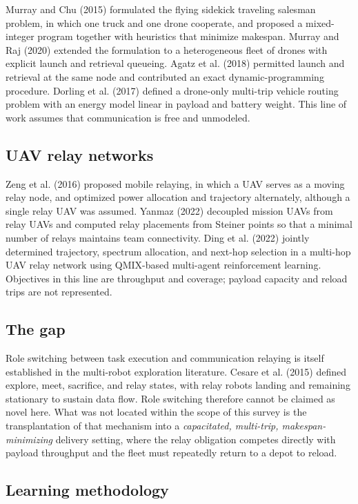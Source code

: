 \documentclass[12pt]{article}
\begin{document}
Murray and Chu (2015) formulated the flying sidekick traveling salesman problem, in which one truck
and one drone cooperate, and proposed a mixed-integer program together with heuristics that
minimize makespan. Murray and Raj (2020) extended the formulation to a heterogeneous fleet of
drones with explicit launch and retrieval queueing. Agatz et al. (2018) permitted launch and
retrieval at the same node and contributed an exact dynamic-programming procedure. Dorling et al.
(2017) defined a drone-only multi-trip vehicle routing problem with an energy model linear in
payload and battery weight. This line of work assumes that communication is free and unmodeled.

\subsection{UAV relay networks}

Zeng et al. (2016) proposed mobile relaying, in which a UAV serves as a moving relay node, and
optimized power allocation and trajectory alternately, although a single relay UAV was assumed.
Yanmaz (2022) decoupled mission UAVs from relay UAVs and computed relay placements from Steiner
points so that a minimal number of relays maintains team connectivity. Ding et al. (2022) jointly
determined trajectory, spectrum allocation, and next-hop selection in a multi-hop UAV relay network
using QMIX-based multi-agent reinforcement learning. Objectives in this line are throughput and
coverage; payload capacity and reload trips are not represented.

\subsection{The gap}

Role switching between task execution and communication relaying is itself established in the
multi-robot exploration literature. Cesare et al. (2015) defined explore, meet, sacrifice, and
relay states, with relay robots landing and remaining stationary to sustain data flow. Role
switching therefore cannot be claimed as novel here. What was not located within the scope of this
survey is the transplantation of that mechanism into a \emph{capacitated, multi-trip,
makespan-minimizing} delivery setting, where the relay obligation competes directly with payload
throughput and the fleet must repeatedly return to a depot to reload.

\subsection{Learning methodology}
\end{document}
